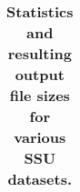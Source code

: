 \begin{table}[hb]
\begin{center}
\begin{tabular}{lllrr|rrrr|rr}
\end{tabular}
\end{center}
\label{tbl:sizes}
\caption{\textbf{Statistics and resulting output file sizes for
    various SSU datasets.}}
\end{table}
